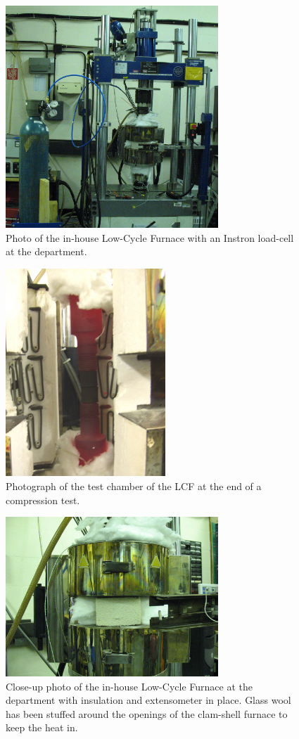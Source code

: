 %
\begin{figure}[H]
\begin{center}
\includegraphics[width=8cm]{lcf}
\caption{Photo of the in-house Low-Cycle Furnace with an Instron load-cell at the department.}\label{fig:lcf}
\end{center}
\end{figure}
%
%
\begin{figure}[H]
\begin{center}
\includegraphics[width=6cm]{lcfhot}
\caption{Photograph of the test chamber of the LCF at the end of a compression test.}
\label{fig:lcfhot}
\end{center}
\end{figure}
%
%
\begin{figure}[H]
\begin{center}
\includegraphics[width=8cm]{lcfcloseup}
\caption{Close-up photo of the in-house Low-Cycle Furnace at the department with insulation and extensometer in place.  Glass wool has been stuffed around the openings of the clam-shell furnace to keep the heat in.}\label{fig:lcfcloseup}
\end{center}
\end{figure}
